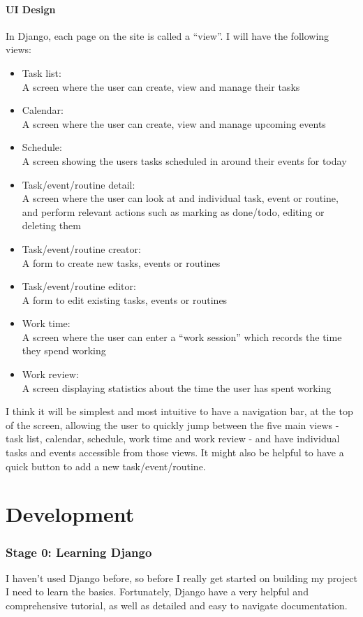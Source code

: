 \documentclass{article}
\begin{document}
\subsection{UI Design}
In Django,
each page on the site is called a ``view''.
I will have the following views:
\begin{itemize}
\item Task list:\\
  A screen where the user can create, view and manage their tasks
\item Calendar:\\
  A screen where the user can create, view and manage upcoming events
\item Schedule:\\
  A screen showing the users tasks scheduled in around their events for today
\item Task/event/routine detail:\\
  A screen where the user can look at and individual task, event or routine,
  and perform relevant actions such as marking as done/todo,
  editing or deleting them
\item Task/event/routine creator:\\
  A form to create new tasks, events or routines
\item Task/event/routine editor:\\
  A form to edit existing tasks, events or routines
\item Work time:\\
  A screen where the user can enter a ``work session'' which records the time they spend working
\item Work review:\\
  A screen displaying statistics about the time the user has spent working
\end{itemize}

I think it will be simplest and most intuitive to have a navigation bar,
at the top of the screen,
allowing the user to quickly jump between the five main views -
task list, calendar, schedule, work time and work review -
and have individual tasks and events accessible from those views.
It might also be helpful to have a quick button to add a new task/event/routine.

\part{Development}
\section{Stage 0: Learning Django}
I haven't used Django before,
so before I really get started on building my project I need to learn the basics.
Fortunately, Django have a very helpful and comprehensive tutorial,
as well as detailed and easy to navigate documentation.
\end{document}
